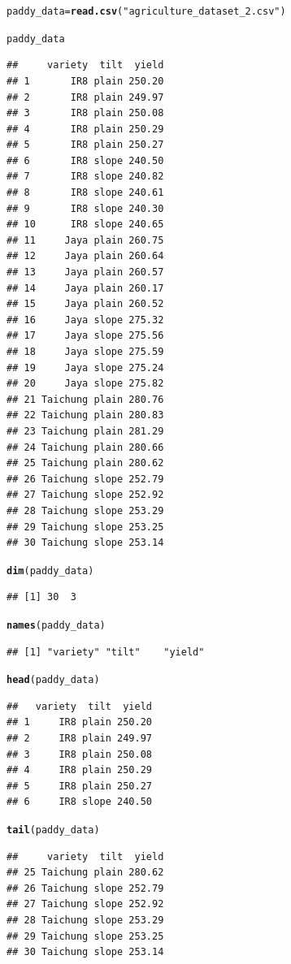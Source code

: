 \documentclass[11pt, a4paper]{article}\usepackage[]{graphicx}\usepackage[dvipsnames]{xcolor}
\makeatletter
\newcommand{\hlstr}[1]{\textcolor[rgb]{0.192,0.494,0.8}{#1}}%
\newcommand{\hlstd}[1]{\textcolor[rgb]{0.345,0.345,0.345}{#1}}%
\newcommand{\hlkwb}[1]{\textcolor[rgb]{0.69,0.353,0.396}{#1}}%
\newcommand{\hlkwd}[1]{\textcolor[rgb]{0.737,0.353,0.396}{\textbf{#1}}}%
\newenvironment{kframe}{%
 \def\at@end@of@kframe{}%
 \ifinner\ifhmode%
  \def\at@end@of@kframe{\end{minipage}}%
  \begin{minipage}{\columnwidth}%
 \fi\fi%
 \def\FrameCommand##1{\hskip\@totalleftmargin \hskip-\fboxsep
 \colorbox{shadecolor}{##1}\hskip-\fboxsep
     \hskip-\linewidth \hskip-\@totalleftmargin \hskip\columnwidth}%
 \MakeFramed {\advance\hsize-\width
   \@totalleftmargin\z@ \linewidth\hsize
   \@setminipage}}%
 {\par\unskip\endMakeFramed%
 \at@end@of@kframe}
\newenvironment{knitrout}{}{} %
\makeatother
\begin{document}
\begin{knitrout}
\color{fgcolor}\begin{kframe}
\begin{alltt}
\hlstd{paddy_data} \hlkwb{=} \hlkwd{read.csv}\hlstd{(}\hlstr{"agriculture_dataset_2.csv"}\hlstd{)}

\hlstd{paddy_data}
\end{alltt}
\begin{verbatim}
##     variety  tilt  yield
## 1       IR8 plain 250.20
## 2       IR8 plain 249.97
## 3       IR8 plain 250.08
## 4       IR8 plain 250.29
## 5       IR8 plain 250.27
## 6       IR8 slope 240.50
## 7       IR8 slope 240.82
## 8       IR8 slope 240.61
## 9       IR8 slope 240.30
## 10      IR8 slope 240.65
## 11     Jaya plain 260.75
## 12     Jaya plain 260.64
## 13     Jaya plain 260.57
## 14     Jaya plain 260.17
## 15     Jaya plain 260.52
## 16     Jaya slope 275.32
## 17     Jaya slope 275.56
## 18     Jaya slope 275.59
## 19     Jaya slope 275.24
## 20     Jaya slope 275.82
## 21 Taichung plain 280.76
## 22 Taichung plain 280.83
## 23 Taichung plain 281.29
## 24 Taichung plain 280.66
## 25 Taichung plain 280.62
## 26 Taichung slope 252.79
## 27 Taichung slope 252.92
## 28 Taichung slope 253.29
## 29 Taichung slope 253.25
## 30 Taichung slope 253.14
\end{verbatim}
\begin{alltt}
\hlkwd{dim}\hlstd{(paddy_data)}
\end{alltt}
\begin{verbatim}
## [1] 30  3
\end{verbatim}
\begin{alltt}
\hlkwd{names}\hlstd{(paddy_data)}
\end{alltt}
\begin{verbatim}
## [1] "variety" "tilt"    "yield"
\end{verbatim}
\begin{alltt}
\hlkwd{head}\hlstd{(paddy_data)}
\end{alltt}
\begin{verbatim}
##   variety  tilt  yield
## 1     IR8 plain 250.20
## 2     IR8 plain 249.97
## 3     IR8 plain 250.08
## 4     IR8 plain 250.29
## 5     IR8 plain 250.27
## 6     IR8 slope 240.50
\end{verbatim}
\begin{alltt}
\hlkwd{tail}\hlstd{(paddy_data)}
\end{alltt}
\begin{verbatim}
##     variety  tilt  yield
## 25 Taichung plain 280.62
## 26 Taichung slope 252.79
## 27 Taichung slope 252.92
## 28 Taichung slope 253.29
## 29 Taichung slope 253.25
## 30 Taichung slope 253.14
\end{verbatim}
\end{kframe}
\end{knitrout}
\end{document}
